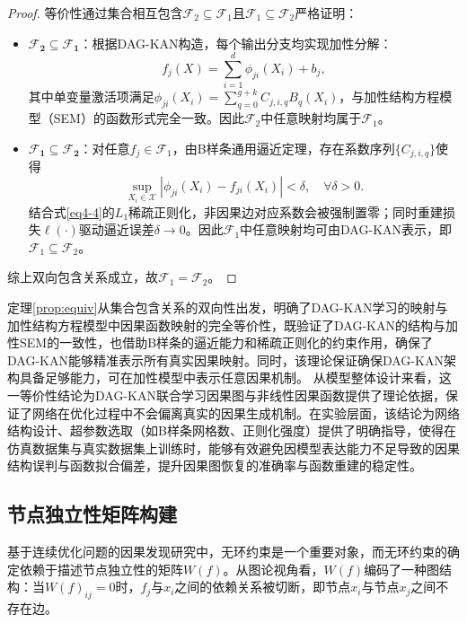 \begin{proof}
	等价性通过集合相互包含$\mathcal{F}_2 \subseteq \mathcal{F}_1$且$\mathcal{F}_1 \subseteq \mathcal{F}_2$严格证明：
	\begin{itemize}
		\item $\boldsymbol{\mathcal{F}_{2}\subseteq\mathcal{F}_{1}}$：根据DAG-KAN构造，每个输出分支均实现加性分解：
		\[
		f_j(X) = \sum_{i=1}^{d} \phi_{ji}(X_i) + b_j,
		\]
		其中单变量激活项满足$\phi_{ji}(X_i) = \sum_{q=0}^{g+k} C_{j,i,q} B_q(X_i)$，与加性结构方程模型（SEM）的函数形式完全一致。因此$\mathcal{F}_{2}$中任意映射均属于$\mathcal{F}_{1}$。
		
		\item $\boldsymbol{\mathcal{F}_{1}\subseteq\mathcal{F}_{2}}$：对任意$f_j \in \mathcal{F}_{1}$，由B样条通用逼近定理，存在系数序列$\{C_{j,i,q}\}$使得
		\[
		\sup_{X_i \in \mathcal{X}} |\phi_{ji}(X_i) - f_{ji}(X_i)| < \delta, \quad \forall \delta > 0.
		\]
		结合式\eqref{eq4-4}的$L_1$稀疏正则化，非因果边对应系数会被强制置零；同时重建损失$\ell(\cdot)$驱动逼近误差$\delta \rightarrow 0$。因此$\mathcal{F}_{1}$中任意映射均可由DAG-KAN表示，即$\mathcal{F}_{1} \subseteq \mathcal{F}_{2}$。
	\end{itemize}
	综上双向包含关系成立，故$\mathcal{F}_{1} = \mathcal{F}_{2}$。
\end{proof}

定理\ref{prop:equiv}从集合包含关系的双向性出发，明确了DAG-KAN学习的映射与加性结构方程模型中因果函数映射的完全等价性，既验证了DAG-KAN的结构与加性SEM的一致性，也借助B样条的逼近能力和稀疏正则化的约束作用，确保了DAG-KAN能够精准表示所有真实因果映射。同时，该理论保证确保DAG-KAN架构具备足够能力，可在加性模型中表示任意因果机制。
从模型整体设计来看，这一等价性结论为DAG-KAN联合学习因果图与非线性因果函数提供了理论依据，保证了网络在优化过程中不会偏离真实的因果生成机制。在实验层面，该结论为网络结构设计、超参数选取（如B样条网格数、正则化强度）提供了明确指导，使得在仿真数据集与真实数据集上训练时，能够有效避免因模型表达能力不足导致的因果结构误判与函数拟合偏差，提升因果图恢复的准确率与函数重建的稳定性。

\subsection{节点独立性矩阵构建}
基于连续优化问题的因果发现研究中，无环约束是一个重要对象，而无环约束的确定依赖于描述节点独立性的矩阵$W\left( f \right) $。从图论视角看，$W\left( f \right) $编码了一种图结构：当$W\left( f \right) _{ij}=0$时，$f_j$与$x_i$之间的依赖关系被切断，即节点$x_i$与节点$x_j$之间不存在边。

